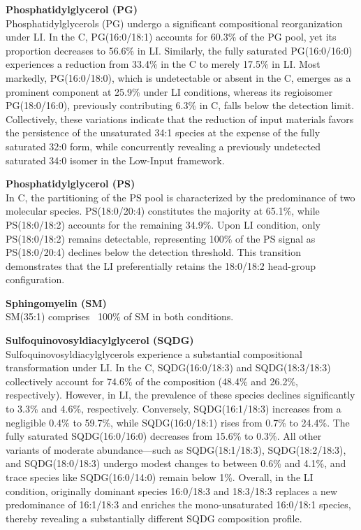 \documentclass[10pt,letterpaper]{article}
\begin{document}
\textbf{Phosphatidylglycerol (PG)}  \\
Phosphatidylglycerols (PG) undergo a significant compositional reorganization under LI. In the  C, PG(16:0/18:1) accounts for 60.3\% of the PG pool, yet its proportion decreases to 56.6\% in LI. Similarly, the fully saturated PG(16:0/16:0) experiences a reduction from 33.4\% in the C to merely 17.5\% in LI. Most markedly, PG(16:0/18:0), which is undetectable or absent in the C, emerges as a prominent component at 25.9\% under LI conditions, whereas its regioisomer PG(18:0/16:0), previously contributing 6.3\% in C, falls below the detection limit. Collectively, these variations indicate that the reduction of input materials favors the persistence of the unsaturated 34:1 species at the expense of the fully saturated 32:0 form, while concurrently revealing a previously undetected saturated 34:0 isomer in the Low-Input framework.

\textbf{Phosphatidylglycerol (PS)}  \\
In C, the partitioning of the PS pool is characterized by the predominance of two molecular species. PS(18:0/20:4) constitutes the majority at 65.1\%, while PS(18:0/18:2) accounts for the remaining 34.9\%. Upon LI condition, only PS(18:0/18:2) remains detectable, representing 100\% of the PS signal as PS(18:0/20:4) declines below the detection threshold. This transition demonstrates that the LI preferentially retains the 18:0/18:2 head-group configuration.


\textbf{Sphingomyelin (SM)}  \\
SM(35:1) comprises ~100\% of SM in both conditions.

\textbf{Sulfoquinovosyldiacylglycerol (SQDG)}  \\
Sulfoquinovosyldiacylglycerols experience a substantial compositional transformation under LI. In the C, SQDG(16:0/18:3) and SQDG(18:3/18:3) collectively account for 74.6\% of the composition (48.4\% and 26.2\%, respectively). However, in LI, the prevalence of these species declines significantly to 3.3\% and 4.6\%, respectively. Conversely, SQDG(16:1/18:3) increases from a negligible 0.4\% to 59.7\%, while SQDG(16:0/18:1) rises from 0.7\% to 24.4\%. The fully saturated SQDG(16:0/16:0) decreases from 15.6\% to 0.3\%. All other variants of moderate abundance—such as SQDG(18:1/18:3), SQDG(18:2/18:3), and SQDG(18:0/18:3) undergo modest changes to between 0.6\% and 4.1\%, and trace species like SQDG(16:0/14:0) remain below 1\%. Overall, in the LI condition, originally dominant species 16:0/18:3 and 18:3/18:3 replaces a new predominance of 16:1/18:3 and enriches the mono-unsaturated 16:0/18:1 species, thereby revealing a substantially different SQDG composition profile.
\end{document}
